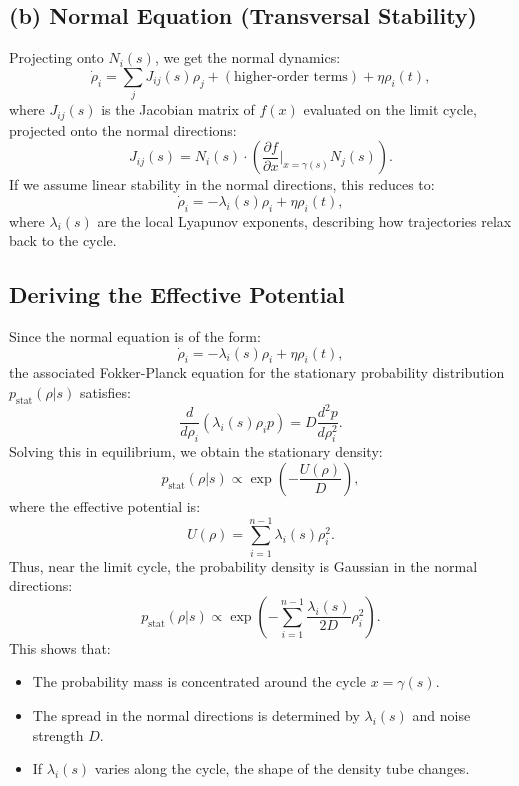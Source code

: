 \documentclass{article}
\theoremstyle{definition} \newtheorem{definition}{Definition}
\theoremstyle{remark} \newtheorem{remark}{Remark}
\newcounter{ct}
\begin{document}
\subsection{(b) Normal Equation (Transversal Stability)}
Projecting onto $N_i(s)$, we get the normal dynamics:
\begin{equation}
    \dot{\rho}_i = \sum_j J_{ij}(s) \rho_j + (\text{higher-order terms}) + \eta \rho_i(t),
\end{equation}
where $J_{ij}(s)$ is the Jacobian matrix of $f(x)$ evaluated on the limit cycle, projected onto the normal directions:
\begin{equation}
    J_{ij}(s) = N_i(s) \cdot \left( \frac{\partial f}{\partial x} \bigg|_{x = \gamma(s)} N_j(s) \right).
\end{equation}
If we assume linear stability in the normal directions, this reduces to:
\begin{equation}
    \dot{\rho}_i = -\lambda_i(s) \rho_i + \eta \rho_i(t),
\end{equation}
where $\lambda_i(s)$ are the local Lyapunov exponents, describing how trajectories relax back to the cycle.

\subsection{Deriving the Effective Potential}

Since the normal equation is of the form:
\begin{equation}
    \dot{\rho}_i = -\lambda_i(s) \rho_i + \eta \rho_i(t),
\end{equation}
the associated Fokker-Planck equation for the stationary probability distribution $p_{\text{stat}}(\rho | s)$ satisfies:
\begin{equation}
    \frac{d}{d \rho_i} \left( \lambda_i(s) \rho_i p \right) = D \frac{d^2 p}{d \rho_i^2}.
\end{equation}
Solving this in equilibrium, we obtain the stationary density:
\begin{equation}
    p_{\text{stat}}(\rho | s) \propto \exp \left( - \frac{U(\rho)}{D} \right),
\end{equation}
where the effective potential is:
\begin{equation}
    U(\rho) = \sum_{i=1}^{n-1} \lambda_i(s) \rho_i^2.
\end{equation}
Thus, near the limit cycle, the probability density is Gaussian in the normal directions:
\begin{equation}
    p_{\text{stat}}(\rho | s) \propto \exp \left( - \sum_{i=1}^{n-1} \frac{\lambda_i(s)}{2D} \rho_i^2 \right).
\end{equation}
This shows that:
\begin{itemize}
    \item The probability mass is concentrated around the cycle $x = \gamma(s)$.
    \item The spread in the normal directions is determined by $\lambda_i(s)$ and noise strength $D$.
    \item If $\lambda_i(s)$ varies along the cycle, the shape of the density tube changes.
\end{itemize}
\end{document}
